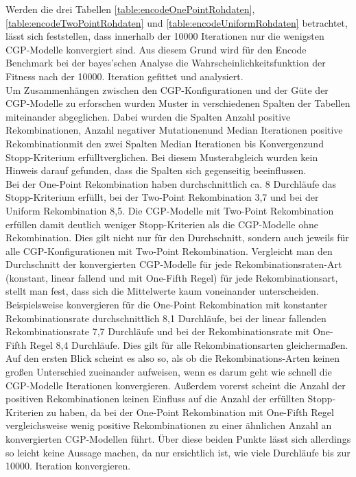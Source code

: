 Werden die drei Tabellen \ref{table:encodeOnePointRohdaten}, \ref{table:encodeTwoPointRohdaten} und \ref{table:encodeUniformRohdaten} betrachtet, lässt sich feststellen, dass innerhalb der 10000 Iterationen nur die wenigsten CGP-Modelle konvergiert sind.
Aus diesem Grund wird für den Encode Benchmark bei der bayes'schen Analyse die Wahrscheinlichkeitsfunktion der Fitness nach der 10000. Iteration gefittet und analysiert.\\
Um Zusammenhängen zwischen den CGP-Konfigurationen und der Güte der CGP-Modelle zu erforschen wurden Muster in verschiedenen Spalten der Tabellen miteinander abgeglichen.
Dabei wurden die Spalten \glqq Anzahl positive Rekombinationen\grqq, \glqq Anzahl negativer Mutationen\grqq\space und \glqq Median Iterationen positive Rekombination\grqq\space mit den zwei Spalten \glqq Median Iterationen bis Konvergenz\grqq\space und \glqq Stopp-Kriterium erfüllt\grqq\space verglichen.
Bei diesem Musterabgleich wurden kein Hinweis darauf gefunden, dass die Spalten sich gegenseitig beeinflussen.\\
Bei der One-Point Rekombination haben durchschnittlich ca. 8 Durchläufe das Stopp-Kri\-te\-rium erfüllt, bei der Two-Point Rekombination 3,7 und bei der Uniform Rekombination 8,5. 
Die CGP-Modelle mit Two-Point Rekombination erfüllen damit deutlich weniger Stopp-Kriterien als die CGP-Modelle ohne Rekombination.
Dies gilt nicht nur für den Durchschnitt, sondern auch jeweils für alle CGP-Konfigurationen mit Two-Point Rekombination.
Vergleicht man den Durchschnitt der konvergierten CGP-Modelle für jede Re\-kom\-bi\-na\-tions\-ra\-ten-Art (konstant, linear fallend und mit One-Fifth Regel) für jede Rekombinationsart, stellt man fest, dass sich die Mittelwerte kaum voneinander unterscheiden.
Beispielsweise konvergieren für die One-Point Rekombination mit konstanter Rekombinationsrate durchschnittlich 8,1 Durchläufe, bei der linear fallenden Rekombinationsrate 7,7 Durchläufe und bei der Rekombinationsrate mit One-Fifth Regel 8,4 Durchläufe. 
Dies gilt für alle Rekombinationsarten gleichermaßen.
Auf den ersten Blick scheint es also so, als ob die Rekombinations-Arten keinen großen Unterschied zueinander aufweisen, wenn es darum geht wie schnell die CGP-Modelle Iterationen konvergieren.
Außerdem vorerst scheint die Anzahl der positiven Rekombinationen keinen Einfluss auf die Anzahl der erfüllten Stopp-Kriterien zu haben, da bei der One-Point Rekombination mit One-Fifth Regel vergleichsweise wenig positive Rekombinationen zu einer ähnlichen Anzahl an konvergierten CGP-Modellen führt.
Über diese beiden Punkte lässt sich allerdings so leicht keine Aussage machen, da nur ersichtlich ist, wie viele Durchläufe bis zur 10000. Iteration konvergieren.
